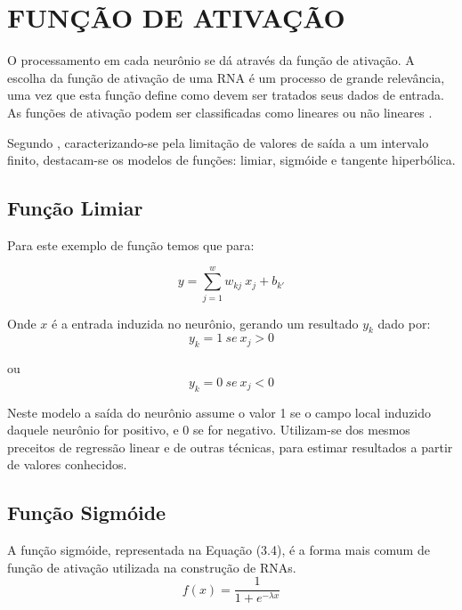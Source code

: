 \section{FUNÇÃO DE ATIVAÇÃO}\label{sec:funcao-ativacao}
O processamento em cada neurônio se dá através da função de ativação. A escolha da função de ativação de uma RNA é um processo de grande relevância, uma vez que esta função define como devem ser tratados seus dados de entrada. As funções de ativação podem ser classificadas como lineares ou não lineares \cite{haykin2000}.

Segundo , caracterizando-se pela limitação de valores de saída a um intervalo finito, destacam-se os modelos de funções: limiar, sigmóide e tangente hiperbólica.

\subsection{Função Limiar}
Para este exemplo de função temos que para:
 
\begin{equation}\label{eq:limiar}
y=\sum_{j=1}^{w} w_{kj}\ x_j + b_{k'}
\end{equation}

Onde $x$ é a entrada induzida no neurônio, gerando um resultado $y_k$ dado por:
\begin{equation}\label{eq:limiar-result} 
y_k = {1\ se\ x_j  > 0}
\end{equation}

ou
\begin{equation}\label{eq:limiar-result} 
y_k = {0\ se\ x_j < 0}  
\end{equation}

Neste modelo a saída do neurônio assume o valor 1 se o campo local induzido daquele neurônio for positivo, e 0 se for negativo. Utilizam-se dos mesmos preceitos de regressão linear e de outras técnicas, para estimar resultados a partir de valores conhecidos.

\subsection{Função Sigmóide}
A função sigmóide, representada na Equação (3.4), é a forma mais comum de função de ativação utilizada na construção de RNAs.
\begin{equation}\label{eq:limiar-result} 
f(x)=\frac{1}{1+e^{- \lambda x}}
\end{equation}

